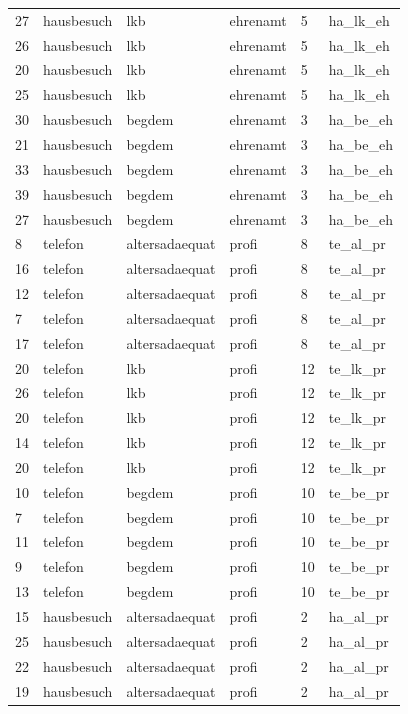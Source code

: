 \documentclass[
  doc,floatsintext]{apa6}
\begin{document}
\begin{table}[tbp]
\begin{center}
\begin{threeparttable}
\begin{tabular}{llllll}
27 & hausbesuch & lkb & ehrenamt & 5 & ha\_lk\_eh\\
26 & hausbesuch & lkb & ehrenamt & 5 & ha\_lk\_eh\\
20 & hausbesuch & lkb & ehrenamt & 5 & ha\_lk\_eh\\
25 & hausbesuch & lkb & ehrenamt & 5 & ha\_lk\_eh\\
30 & hausbesuch & begdem & ehrenamt & 3 & ha\_be\_eh\\
21 & hausbesuch & begdem & ehrenamt & 3 & ha\_be\_eh\\
33 & hausbesuch & begdem & ehrenamt & 3 & ha\_be\_eh\\
39 & hausbesuch & begdem & ehrenamt & 3 & ha\_be\_eh\\
27 & hausbesuch & begdem & ehrenamt & 3 & ha\_be\_eh\\
8 & telefon & altersadaequat & profi & 8 & te\_al\_pr\\
16 & telefon & altersadaequat & profi & 8 & te\_al\_pr\\
12 & telefon & altersadaequat & profi & 8 & te\_al\_pr\\
7 & telefon & altersadaequat & profi & 8 & te\_al\_pr\\
17 & telefon & altersadaequat & profi & 8 & te\_al\_pr\\
20 & telefon & lkb & profi & 12 & te\_lk\_pr\\
26 & telefon & lkb & profi & 12 & te\_lk\_pr\\
20 & telefon & lkb & profi & 12 & te\_lk\_pr\\
14 & telefon & lkb & profi & 12 & te\_lk\_pr\\
20 & telefon & lkb & profi & 12 & te\_lk\_pr\\
10 & telefon & begdem & profi & 10 & te\_be\_pr\\
7 & telefon & begdem & profi & 10 & te\_be\_pr\\
11 & telefon & begdem & profi & 10 & te\_be\_pr\\
9 & telefon & begdem & profi & 10 & te\_be\_pr\\
13 & telefon & begdem & profi & 10 & te\_be\_pr\\
15 & hausbesuch & altersadaequat & profi & 2 & ha\_al\_pr\\
25 & hausbesuch & altersadaequat & profi & 2 & ha\_al\_pr\\
22 & hausbesuch & altersadaequat & profi & 2 & ha\_al\_pr\\
19 & hausbesuch & altersadaequat & profi & 2 & ha\_al\_pr\\

\end{tabular}
\end{threeparttable}
\end{center}
\end{table}
\end{document}
